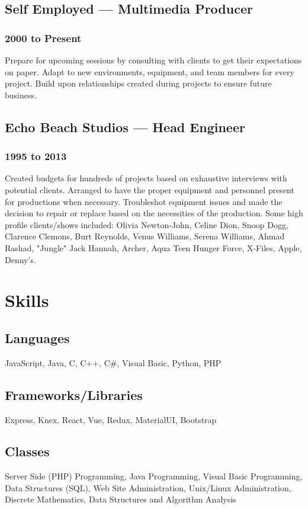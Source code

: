 \documentclass{article}
\begin{document}
\subsection{Self Employed --- Multimedia Producer}
\subsubsection{2000 to Present}
Prepare for upcoming sessions by consulting with clients to get their expectations on paper.
Adapt to new environments, equipment, and team members for every project.
Build upon relationships created during projects to ensure future business.

\subsection{Echo Beach Studios --- Head Engineer}
\subsubsection{1995 to 2013}
Created budgets for hundreds of projects based on exhaustive interviews with potential clients.
Arranged to have the proper equipment and personnel present for productions when necessary.
Troubleshot  equipment issues and made the decision to repair or replace based on the necessities of the production.
Some high profile clients/shows included: Olivia Newton-John, Celine Dion, Snoop Dogg, Clarence Clemons, Burt Reynolds, Venus Williams, Serena Williams, Ahmad Rashad, "Jungle" Jack Hannah, Archer, Aqua Teen Hunger Force, X-Files, Apple, Denny's.




\section{Skills}
\subsection{Languages}
JavaScript, Java, C, C++, C\#, Visual Basic, Python, PHP

\subsection{Frameworks/Libraries}
Express, Knex, React, Vue, Redux, MaterialUI, Bootstrap

\subsection{Classes}
Server Side (PHP) Programming, Java Programming, Visual Basic Programming, Data Structures (SQL), Web Site Administration, Unix/Linux Administration, Discrete Mathematics, Data Structures and Algorithm Analysis
\end{document}

